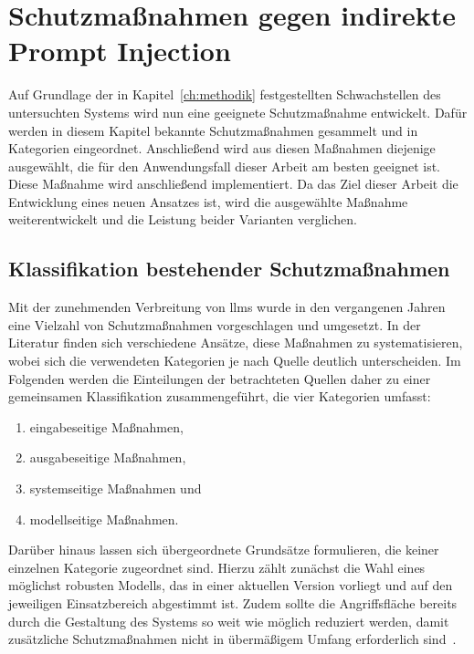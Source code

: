 \chapter{Schutzmaßnahmen gegen indirekte Prompt Injection}\label{ch:schutzmassnahmen}

Auf Grundlage der in Kapitel~\ref{ch:methodik} festgestellten Schwachstellen des untersuchten Systems wird nun eine geeignete Schutzmaßnahme entwickelt. Dafür werden
in diesem Kapitel bekannte Schutzmaßnahmen gesammelt und in Kategorien eingeordnet. Anschließend wird aus diesen Maßnahmen diejenige ausgewählt, die
für den Anwendungsfall dieser Arbeit am besten geeignet ist. Diese Maßnahme wird anschließend implementiert. Da das Ziel dieser Arbeit die
Entwicklung eines neuen Ansatzes ist, wird die ausgewählte Maßnahme weiterentwickelt und die Leistung beider Varianten verglichen.

\section{Klassifikation bestehender Schutzmaßnahmen}\label{sec:klassifikation_schutzmassnahmen}

Mit der zunehmenden Verbreitung von \acp{llm} wurde in den vergangenen Jahren eine Vielzahl von Schutzmaßnahmen vorgeschlagen und umgesetzt. In der Literatur finden sich
verschiedene Ansätze, diese Maßnahmen zu systematisieren, wobei sich die verwendeten Kategorien je nach Quelle deutlich unterscheiden. Im Folgenden werden die
Einteilungen der betrachteten Quellen daher zu einer gemeinsamen Klassifikation zusammengeführt, die vier Kategorien umfasst:

\begin{enumerate}
    \item eingabeseitige Maßnahmen,
    \item ausgabeseitige Maßnahmen,
    \item systemseitige Maßnahmen und
    \item modellseitige Maßnahmen.
\end{enumerate}

Darüber hinaus lassen sich übergeordnete Grundsätze formulieren, die keiner einzelnen Kategorie zugeordnet sind. Hierzu zählt zunächst die Wahl eines möglichst robusten
Modells, das in einer aktuellen Version vorliegt und auf den jeweiligen Einsatzbereich abgestimmt ist. Zudem sollte die Angriffsfläche bereits durch die Gestaltung des
Systems so weit wie möglich reduziert werden, damit zusätzliche Schutzmaßnahmen nicht in übermäßigem Umfang erforderlich sind~\cite{sm04}.

